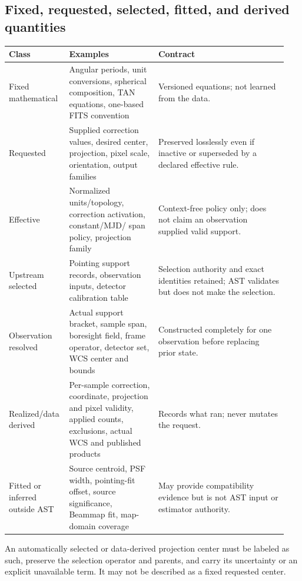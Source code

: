 \documentclass[11pt]{article}
\begin{document}
\subsection{Fixed, requested, selected, fitted, and derived quantities}

\begin{longtable}{>{\raggedright\arraybackslash}p{0.18\linewidth}
                  >{\raggedright\arraybackslash}p{0.31\linewidth}
                  >{\raggedright\arraybackslash}p{0.45\linewidth}}
\toprule
Class & Examples & Contract \\
\midrule
\endhead
Fixed mathematical & Angular periods, unit conversions, spherical
composition, TAN equations, one-based FITS convention & Versioned equations;
not learned from the data. \\
Requested & Supplied correction values, desired center, projection, pixel
scale, orientation, output families & Preserved losslessly even if inactive
or superseded by a declared effective rule. \\
Effective & Normalized units/topology, correction activation, constant/MJD/
span policy, projection family & Context-free policy only; does not claim an
observation supplied valid support. \\
Upstream selected & Pointing support records, observation inputs, detector
calibration table & Selection authority and exact identities retained; AST
validates but does not make the selection. \\
Observation resolved & Actual support bracket, sample span, boresight field,
frame operator, detector set, WCS center and bounds & Constructed completely
for one observation before replacing prior state. \\
Realized/data derived & Per-sample correction, coordinate, projection and
pixel validity, applied counts, exclusions, actual WCS and published products
& Records what ran; never mutates the request. \\
Fitted or inferred outside AST & Source centroid, PSF width, pointing-fit
offset, source significance, Beammap fit, map-domain coverage & May provide
compatibility evidence but is not AST input or estimator authority. \\
\bottomrule
\end{longtable}

An automatically selected or data-derived projection center must be labeled
as such, preserve the selection operator and parents, and carry its
uncertainty or an explicit unavailable term.  It may not be described as a
fixed requested center.
\end{document}
